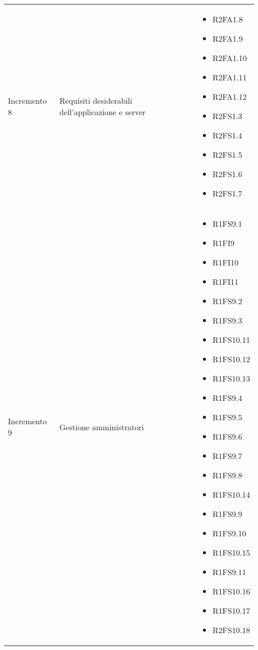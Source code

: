{\begin{longtable}{C{4cm} C{6cm} C{4cm}}
Incremento 8 & Requisiti desiderabili dell'applicazione e server & \begin{itemize}
    \item[ ] R2FA1.8
    \item[ ] R2FA1.9
    \item[ ] R2FA1.10
    \item[ ] R2FA1.11
    \item[ ] R2FA1.12
    \item[ ] R2FS1.3
    \item[ ] R2FS1.4
    \item[ ] R2FS1.5
    \item[ ] R2FS1.6
    \item[ ] R2FS1.7
\end{itemize}\\

Incremento 9 & Gestione amministratori & \begin{itemize}

    \item[ ] R1FS9.1
    \item[ ] R1FI9
    \item[ ] R1FI10
    \item[ ] R1FI11
    \item[ ] R1FS9.2
    \item[ ] R1FS9.3
    \item[ ] R1FS10.11
    \item[ ] R1FS10.12
    \item[ ] R1FS10.13
    \item[ ] R1FS9.4
    \item[ ] R1FS9.5
    \item[ ] R1FS9.6
    \item[ ] R1FS9.7
    \item[ ] R1FS9.8
    \item[ ] R1FS10.14
    \item[ ] R1FS9.9
    \item[ ] R1FS9.10
    \item[ ] R1FS10.15
    \item[ ] R1FS9.11
    \item[ ] R1FS10.16
    \item[ ] R1FS10.17
    \item[ ] R2FS10.18
\end{itemize}\\

\end{longtable}
}